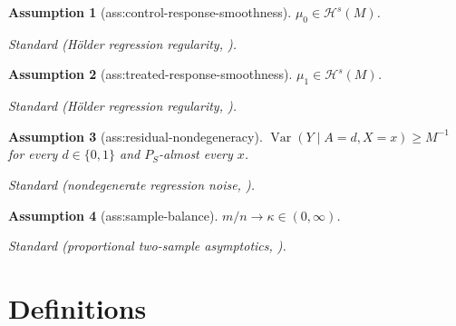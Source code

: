 \documentclass{article}
\newtheorem{assumption}{Assumption}
\begin{document}
\begin{assumption}[ass:control-response-smoothness]\label{ass:control-response-smoothness}
\(\mu_0\in\mathcal H^s(M)\).
\par\smallskip\noindent\emph{Standard} (Hölder regression regularity, \cite{Tsybakov2009}).
\end{assumption}

\begin{assumption}[ass:treated-response-smoothness]\label{ass:treated-response-smoothness}
\(\mu_1\in\mathcal H^s(M)\).
\par\smallskip\noindent\emph{Standard} (Hölder regression regularity, \cite{Tsybakov2009}).
\end{assumption}

\begin{assumption}[ass:residual-nondegeneracy]\label{ass:residual-nondegeneracy}
\(\operatorname{Var}(Y\mid A=d,X=x)\ge M^{-1}\) for every \(d\in\{0,1\}\) and \(P_S\)-almost every \(x\).
\par\smallskip\noindent\emph{Standard} (nondegenerate regression noise, \cite{Tsybakov2009}).
\end{assumption}

\begin{assumption}[ass:sample-balance]\label{ass:sample-balance}
\(m/n\to\kappa\in(0,\infty)\).
\par\smallskip\noindent\emph{Standard} (proportional two-sample asymptotics, \cite{BurmanGamaloGhosalKundu2026}).
\end{assumption}

\section{Definitions}
\end{document}

